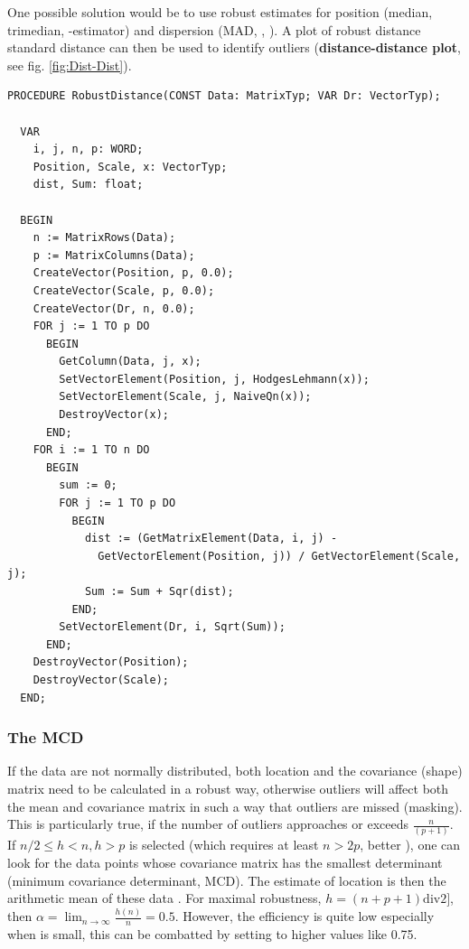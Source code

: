 \begin{refsection}
One possible solution would be to use robust estimates for position (median, trimedian, -estimator) and dispersion (\acs{MAD}, , ). A plot of robust distance  standard  distance can then be used to identify outliers (\textbf{distance-distance plot}, see fig. \ref{fig:Dist-Dist}).

\begin{lstlisting}[caption=Robust distance]
  PROCEDURE RobustDistance(CONST Data: MatrixTyp; VAR Dr: VectorTyp);

  VAR
    i, j, n, p: WORD;
    Position, Scale, x: VectorTyp;
    dist, Sum: float;

  BEGIN
    n := MatrixRows(Data);
    p := MatrixColumns(Data);
    CreateVector(Position, p, 0.0);
    CreateVector(Scale, p, 0.0);
    CreateVector(Dr, n, 0.0);
    FOR j := 1 TO p DO
      BEGIN
        GetColumn(Data, j, x);
        SetVectorElement(Position, j, HodgesLehmann(x));
        SetVectorElement(Scale, j, NaiveQn(x));
        DestroyVector(x);
      END;
    FOR i := 1 TO n DO
      BEGIN
        sum := 0;
        FOR j := 1 TO p DO
          BEGIN
            dist := (GetMatrixElement(Data, i, j) -
              GetVectorElement(Position, j)) / GetVectorElement(Scale, j);
            Sum := Sum + Sqr(dist);
          END;
        SetVectorElement(Dr, i, Sqrt(Sum));
      END;
    DestroyVector(Position);
    DestroyVector(Scale);
  END;
\end{lstlisting}


\subsubsection{The \acf{MCD}}

If the data are not normally distributed, both location and the covariance (shape) matrix need to be calculated in a robust way, otherwise outliers will affect both the mean and covariance matrix in such a way that outliers are missed (masking).  This is particularly true, if the number of outliers approaches or exceeds \(\frac{n}{(p+1)} \). If \(n/2 \leq h < n, h > p \) is selected (which requires at least \( n > 2p \), better ), one can look for the  data points whose covariance matrix has the smallest determinant (minimum covariance determinant, MCD). The estimate of location is then the arithmetic mean of these  data \parencite{Hub-10,Rou-87}. For maximal robustness, \(  h = (n + p + 1) \mathrm{div} 2] \), then \( \alpha = \lim_{n\rightarrow \infty} \frac{h(n)}{n} = 0.5 \). However, the efficiency is quite low especially when  is small, this can be combatted by setting \skalar{\alpha} to higher values like \num{0.75}.


\end{refsection}
